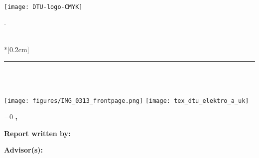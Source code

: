 \calccentering{\unitlength}
\begin{titlingpage}
\thispagestyle{empty}
\sffamily
\vspace*{-2.8cm}
\hfill\texttt{[image: DTU-logo-CMYK]}
\begin{adjustwidth*}{\unitlength}{-\unitlength}
    \begin{adjustwidth}{-0.5cm}{-0.5cm}
		\noindent
		
		
		\noindent\textbf{\Huge\ThTitle} \\*[0.2cm]
		\textcolor{dtured}{\rule{\textwidth + 1.5cm}{4pt}}
		\begin{flushleft}
		\Large
            \ThAuthors\\
            \thesistype{}\\
            \ThYear
        \end{flushleft}
		\noindent
		\texttt{[image: figures/IMG\_0313\_frontpage.png]}
		\newline
		\newline
		\newline
		\texttt{[image: tex\_dtu\_elektro\_a\_uk]}
	\end{adjustwidth}
\end{adjustwidth*}
	\cleartoevenpage
		\thispagestyle{empty}
		\ifnum\pdfstrcmp{\ThSubtitle}{}=0 %
		\noindent\textbf{\ThTitle}
		\else
		\noindent\textbf{\ThTitle, \ThSubtitle}
		\fi

		\noindent\textbf{Report written by:}\\
		\ThAuthors


		\noindent\textbf{Advisor(s):}\\
		\ThSupervisors


		\noindent\ThDepartment


		\noindent\ThElektroEmail


\end{titlingpage}
